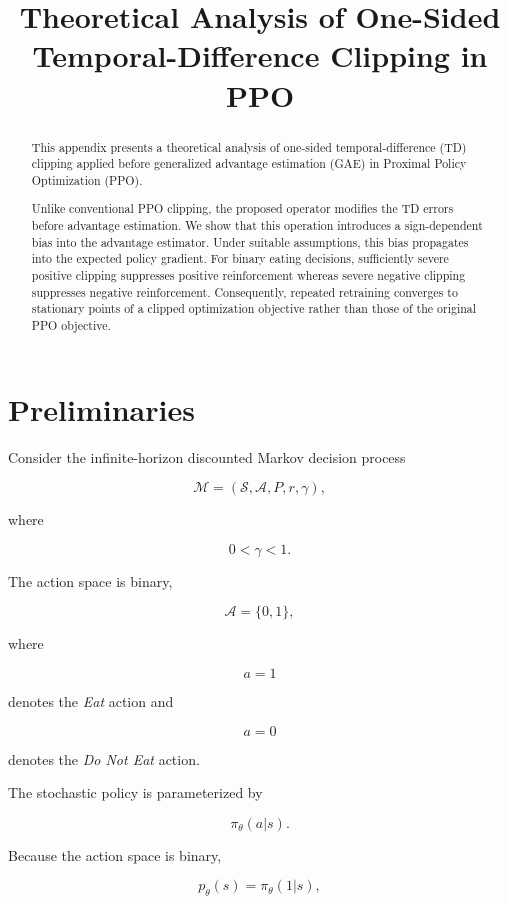 \documentclass[11pt]{article}
\title{Theoretical Analysis of One-Sided Temporal-Difference Clipping in PPO}
\author{}
\date{}
\begin{document}
\maketitle

\begin{abstract}

This appendix presents a theoretical analysis of one-sided
temporal-difference (TD) clipping applied before generalized
advantage estimation (GAE) in Proximal Policy Optimization (PPO).

Unlike conventional PPO clipping, the proposed operator modifies
the TD errors before advantage estimation.
We show that this operation introduces a sign-dependent bias into
the advantage estimator.
Under suitable assumptions, this bias propagates into the expected
policy gradient.
For binary eating decisions, sufficiently severe positive clipping
suppresses positive reinforcement whereas severe negative clipping
suppresses negative reinforcement.
Consequently, repeated retraining converges to stationary points of
a clipped optimization objective rather than those of the original
PPO objective.

\end{abstract}


\section{Preliminaries}

Consider the infinite-horizon discounted Markov decision process

\[
\mathcal{M}
=
(\mathcal S,\mathcal A,P,r,\gamma),
\]

where

\[
0<\gamma<1.
\]

The action space is binary,

\[
\mathcal A
=
\{0,1\},
\]

where

\[
a=1
\]

denotes the \emph{Eat} action and

\[
a=0
\]

denotes the \emph{Do Not Eat} action.

The stochastic policy is parameterized by

\[
\pi_\theta(a|s).
\]

Because the action space is binary,

\[
p_\theta(s)
=
\pi_\theta(1|s),
\]
\end{document}

